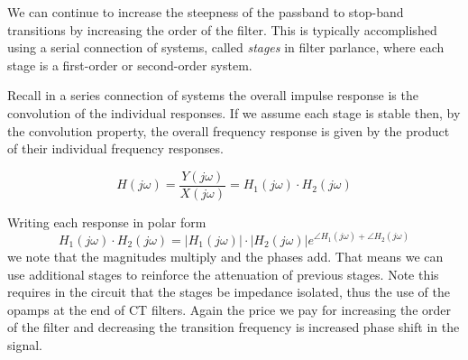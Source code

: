 We can continue to increase the steepness of the passband to stop-band transitions by increasing the order of the filter. This is typically accomplished using a serial connection of systems, called \emph{stages} in filter parlance, where each stage is a first-order or second-order system.

Recall in a series connection of systems the overall impulse response is the convolution of the individual responses. If  we assume each stage is stable then, by the convolution property, the overall frequency response is given by the product of their individual frequency responses.
\begin{center}
\end{center}

\[
H(j\omega) = \frac{Y(j\omega)}{X(j\omega)} = H_1(j\omega)\cdot H_2(j\omega)
\]

Writing each response in polar form
\[
H_1(j\omega)\cdot H_2(j\omega) = |H_1(j\omega)|\cdot |H_2(j\omega)| e^{\angle H_1(j\omega)+ \angle H_2(j\omega)}
\]
we note that the magnitudes multiply and the phases add. That means we can use additional stages to reinforce the attenuation of previous stages. Note this requires in the circuit that the stages be impedance isolated, thus the use of the opamps at the end of CT filters. Again the price we pay for increasing the order of the filter and decreasing the transition frequency is increased phase shift in the signal.

